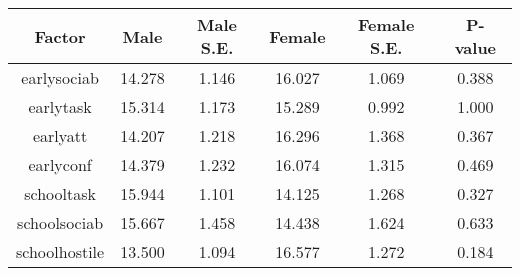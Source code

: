 \begin{longtable}{c c c c c c}
\toprule
\textbf{Factor} & \textbf{Male} & \textbf{Male S.E.}  & \textbf{Female} & \textbf{Female S.E.} & \textbf{P-value} \\
\midrule
earlysociab & 14.278 & 1.146 &  16.027 & 1.069 & 0.388 \\
earlytask & 15.314 & 1.173 &  15.289 & 0.992 & 1.000 \\
earlyatt & 14.207 & 1.218 &  16.296 & 1.368 & 0.367 \\
earlyconf & 14.379 & 1.232 &  16.074 & 1.315 & 0.469 \\
schooltask & 15.944 & 1.101 &  14.125 & 1.268 & 0.327 \\
schoolsociab & 15.667 & 1.458 &  14.438 & 1.624 & 0.633 \\
schoolhostile & 13.500 & 1.094 &  16.577 & 1.272 & 0.184 \\
\bottomrule
\end{longtable}
